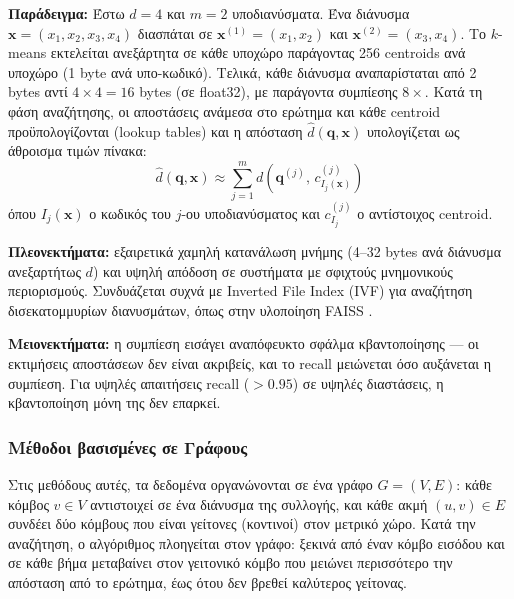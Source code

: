 \documentclass[12pt,a4paper]{article}
\begin{document}
\textbf{Παράδειγμα:} Έστω $d = 4$ και $m = 2$ υποδιανύσματα. Ένα διάνυσμα $\mathbf{x} = (x_1, x_2, x_3, x_4)$ διασπάται σε $\mathbf{x}^{(1)} = (x_1, x_2)$ και $\mathbf{x}^{(2)} = (x_3, x_4)$. Το $k$-means εκτελείται ανεξάρτητα σε κάθε υποχώρο παράγοντας 256 centroids ανά υποχώρο (1 byte ανά υπο-κωδικό). Τελικά, κάθε διάνυσμα αναπαρίσταται από 2 bytes αντί $4 \times 4 = 16$ bytes (σε float32), με παράγοντα συμπίεσης $8\times$. Κατά τη φάση αναζήτησης, οι αποστάσεις ανάμεσα στο ερώτημα και κάθε centroid προϋπολογίζονται (lookup tables) και η απόσταση $\hat{d}(\mathbf{q}, \mathbf{x})$ υπολογίζεται ως άθροισμα τιμών πίνακα:
\[
\hat{d}(\mathbf{q}, \mathbf{x}) \approx \sum_{j=1}^{m} d\!\left(\mathbf{q}^{(j)},\, c^{(j)}_{I_j(\mathbf{x})}\right)
\]
όπου $I_j(\mathbf{x})$ ο κωδικός του $j$-ου υποδιανύσματος και $c^{(j)}_{I_j}$ ο αντίστοιχος centroid.

\textbf{Πλεονεκτήματα:} εξαιρετικά χαμηλή κατανάλωση μνήμης (4--32 bytes ανά διάνυσμα ανεξαρτήτως $d$) και υψηλή απόδοση σε συστήματα με σφιχτούς μνημονικούς περιορισμούς. Συνδυάζεται συχνά με Inverted File Index (IVF) για αναζήτηση δισεκατομμυρίων διανυσμάτων, όπως στην υλοποίηση FAISS \cite{faiss2017}.

\textbf{Μειονεκτήματα:} η συμπίεση εισάγει αναπόφευκτο σφάλμα κβαντοποίησης --- οι εκτιμήσεις αποστάσεων δεν είναι ακριβείς, και το recall μειώνεται όσο αυξάνεται η συμπίεση. Για υψηλές απαιτήσεις recall ($>0.95$) σε υψηλές διαστάσεις, η κβαντοποίηση μόνη της δεν επαρκεί.

\subsubsection{Μέθοδοι βασισμένες σε Γράφους}

Στις μεθόδους αυτές, τα δεδομένα οργανώνονται σε ένα γράφο $G = (V, E)$: κάθε κόμβος $v \in V$ αντιστοιχεί σε ένα διάνυσμα της συλλογής, και κάθε ακμή $(u, v) \in E$ συνδέει δύο κόμβους που είναι γείτονες (κοντινοί) στον μετρικό χώρο. Κατά την αναζήτηση, ο αλγόριθμος πλοηγείται στον γράφο: ξεκινά από έναν κόμβο εισόδου και σε κάθε βήμα μεταβαίνει στον γειτονικό κόμβο που μειώνει περισσότερο την απόσταση από το ερώτημα, έως ότου δεν βρεθεί καλύτερος γείτονας.
\end{document}
